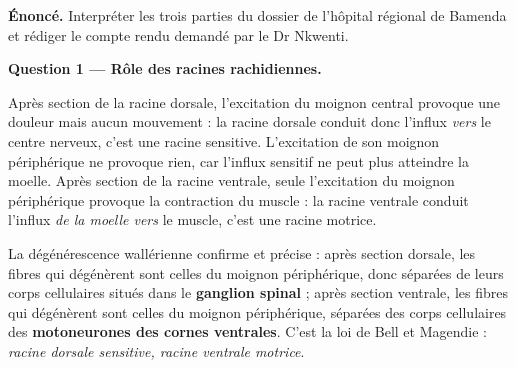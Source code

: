 \documentclass[11pt]{article}
\newcommand{\cle}[1]{{\popxbold\color{popdark}#1}}
\begin{document}
\begin{exoresolu}
\textbf{Énoncé.} Interpréter les trois parties du dossier de l'hôpital régional de Bamenda et rédiger le compte rendu demandé par le Dr Nkwenti.

\tcblower

\textbf{Question 1 — Rôle des racines rachidiennes.}

Après section de la racine dorsale, l'excitation du moignon central provoque une douleur mais aucun mouvement : la racine dorsale conduit donc l'influx \emph{vers} le centre nerveux, c'est une racine \cle{sensitive}. L'excitation de son moignon périphérique ne provoque rien, car l'influx sensitif ne peut plus atteindre la moelle. Après section de la racine ventrale, seule l'excitation du moignon périphérique provoque la contraction du muscle : la racine ventrale conduit l'influx \emph{de la moelle vers} le muscle, c'est une racine \cle{motrice}.

La dégénérescence wallérienne confirme et précise : après section dorsale, les fibres qui dégénèrent sont celles du moignon périphérique, donc séparées de leurs corps cellulaires situés dans le \textbf{ganglion spinal} ; après section ventrale, les fibres qui dégénèrent sont celles du moignon périphérique, séparées des corps cellulaires des \textbf{motoneurones des cornes ventrales}. C'est la loi de Bell et Magendie : \emph{racine dorsale sensitive, racine ventrale motrice}.

\begin{popfigure}
\end{popfigure}
\end{exoresolu}
\end{document}
